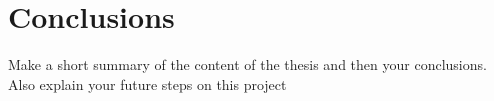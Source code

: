 \chapter*{Conclusions}
\label{chapter:concl}

Make a short summary of the content of the thesis \cite{reyes2018analytical,pena-gomar2006coherent,barrera1991optical,garcia2012multiple} and then your conclusions. Also explain your future steps on this project 

\blindtext

\blindtext
